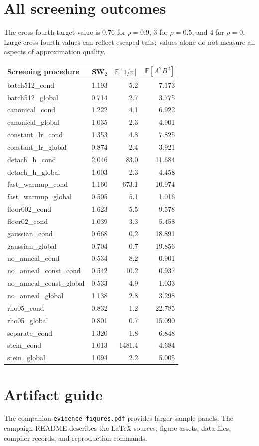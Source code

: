 \documentclass[11pt,a4paper]{article}
\numberwithin{equation}{section}
\newcommand{\E}{\mathbb E}
\begin{document}
\section{All screening outcomes}
The cross-fourth target value is $0.76$ for $\rho=0.9$, $3$ for $\rho=0.5$,
and $4$ for $\rho=0$. Large cross-fourth values can reflect escaped tails;
values alone do not measure all aspects of approximation quality.
\small
\begin{longtable}{p{7cm}rrr}\toprule
Screening procedure & SW$_2$ & $\E[1/v]$ & $\E[A^2B^2]$\\\midrule
\endhead
batch512\_cond & 1.193 & 5.2 & 7.173 \\
batch512\_global & 0.714 & 2.7 & 3.775 \\
canonical\_cond & 1.222 & 4.1 & 6.922 \\
canonical\_global & 1.035 & 2.3 & 4.901 \\
constant\_lr\_cond & 1.353 & 4.8 & 7.825 \\
constant\_lr\_global & 0.874 & 2.4 & 3.921 \\
detach\_h\_cond & 2.046 & 83.0 & 11.684 \\
detach\_h\_global & 1.003 & 2.3 & 4.458 \\
fast\_warmup\_cond & 1.160 & 673.1 & 10.974 \\
fast\_warmup\_global & 0.505 & 5.1 & 1.016 \\
floor002\_cond & 1.623 & 5.5 & 9.578 \\
floor02\_cond & 1.039 & 3.3 & 5.458 \\
gaussian\_cond & 0.668 & 0.2 & 18.891 \\
gaussian\_global & 0.704 & 0.7 & 19.856 \\
no\_anneal\_cond & 0.534 & 8.2 & 0.901 \\
no\_anneal\_const\_cond & 0.542 & 10.2 & 0.937 \\
no\_anneal\_const\_global & 0.533 & 4.9 & 1.033 \\
no\_anneal\_global & 1.138 & 2.8 & 3.298 \\
rho05\_cond & 0.832 & 1.2 & 22.785 \\
rho05\_global & 0.801 & 0.7 & 15.090 \\
separate\_cond & 1.320 & 1.8 & 6.848 \\
stein\_cond & 1.013 & 1481.4 & 4.684 \\
stein\_global & 1.094 & 2.2 & 5.005 \\
\bottomrule\end{longtable}
\normalsize
\section{Artifact guide}
{\small
The companion \texttt{evidence\_figures.pdf} provides larger sample panels.
The campaign README describes the LaTeX sources, figure assets, data files,
compiler records, and reproduction commands.\par}
\end{document}
